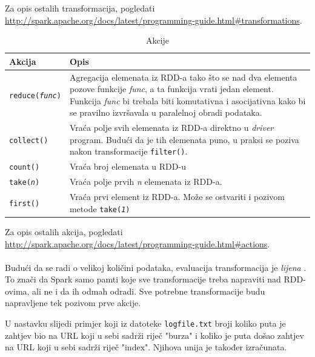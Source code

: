 \documentclass[times, utf8, zavrsni]{fer}
\begin{document}
Za opis ostalih transformacija, pogledati \url{http://spark.apache.org/docs/latest/programming-guide.html#transformations}.
\newpage
\begin{table}[htb]
\scriptsize
\caption{Akcije}
\label{tbl:akcije}
\centering
\begin{tabular}{lp{10cm}} 
\hline
Akcija & Opis \\
\hline
\texttt{reduce(\emph{func})} & Agregacija elemenata iz RDD-a tako što se nad dva elementa pozove funkcije \emph{func}, a ta funkcija vrati jedan element. Funkcija \emph{func} bi trebala biti komutativna i asocijativna kako bi se pravilno izvršavala u paralelnoj obradi podataka.\\
\texttt{collect()} & Vraća polje svih elemenata iz RDD-a direktno u \emph{driver} program. Budući da je tih elemenata puno, u praksi se poziva nakon transformacije \texttt{filter()}. \\
\texttt{count()} & Vraća broj elemenata u RDD-u \\
\texttt{take(\emph{n})} & Vraća polje prvih \emph{n} elemenata iz RDD-a. \\
\texttt{first()} & Vraća prvi element iz RDD-a. Može se ostvariti i pozivom metode  \texttt{take(\emph{1})}\\
\hline
\end{tabular}
\end{table}
Za opis ostalih akcija, pogledati \url{http://spark.apache.org/docs/latest/programming-guide.html#actions}.
\\
\\
Budući da se radi o velikoj količini podataka, evaluacija transformacija je \emph{lijena} . To znači da Spark samo pamti koje sve transformacije treba napraviti nad RDD-ovima, ali ne i da ih odmah odradi. Sve potrebne transformacije budu napravljene tek pozivom prve akcije. 

U nastavku slijedi primjer koji iz datoteke \texttt{logfile.txt} broji koliko puta je zahtjev bio na URL koji u sebi sadrži riječ "burza" i koliko je puta došao zahtjev na URL koji u sebi sadrži riječ "index". Njihova unija je također izračunata.
 
\end{document}
